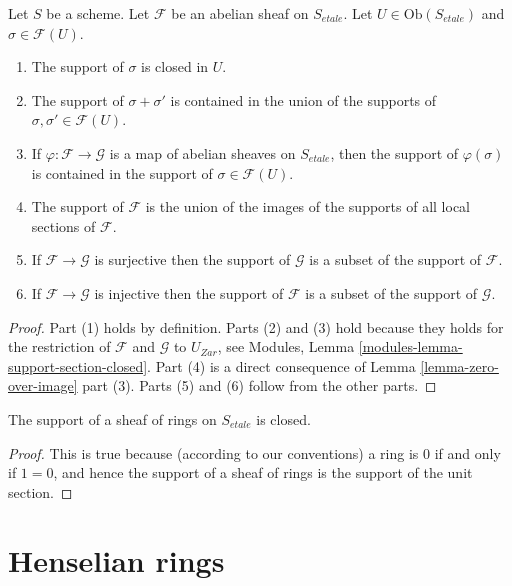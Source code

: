 \begin{lemma}
\label{lemma-support-section-closed}
Let $S$ be a scheme.
Let $\mathcal{F}$ be an abelian sheaf on $S_{etale}$.
Let $U \in \text{Ob}(S_{etale})$ and $\sigma \in \mathcal{F}(U)$.
\begin{enumerate}
\item The support of $\sigma$ is closed in $U$.
\item The support of $\sigma + \sigma'$ is contained in the union of
the supports of $\sigma, \sigma' \in \mathcal{F}(U)$.
\item If $\varphi : \mathcal{F} \to \mathcal{G}$ is a map of
abelian sheaves on $S_{etale}$, then the support of $\varphi(\sigma)$ is
contained in the support of $\sigma \in \mathcal{F}(U)$.
\item The support of $\mathcal{F}$ is the union of the images of the
supports of all local sections of $\mathcal{F}$.
\item If $\mathcal{F} \to \mathcal{G}$ is surjective then the support
of $\mathcal{G}$ is a subset of the support of $\mathcal{F}$.
\item If $\mathcal{F} \to \mathcal{G}$ is injective then the support
of $\mathcal{F}$ is a subset of the support of $\mathcal{G}$.
\end{enumerate}
\end{lemma}

\begin{proof}
Part (1) holds by definition.
Parts (2) and (3) hold because they holds for the restriction of
$\mathcal{F}$ and $\mathcal{G}$ to $U_{Zar}$, see
Modules, Lemma \ref{modules-lemma-support-section-closed}.
Part (4) is a direct consequence of
Lemma \ref{lemma-zero-over-image} part (3).
Parts (5) and (6) follow from the other parts.
\end{proof}

\begin{lemma}
\label{lemma-support-sheaf-rings-closed}
The support of a sheaf of rings on $S_{etale}$ is closed.
\end{lemma}

\begin{proof}
This is true because (according to our conventions)
a ring is $0$ if and only if
$1 = 0$, and hence the support of a sheaf of rings
is the support of the unit section.
\end{proof}




\section{Henselian rings}
\label{section-henselian-ring}

